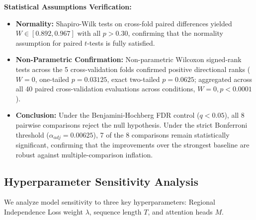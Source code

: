 \textbf{Statistical Assumptions Verification:}
\begin{itemize}
    \item \textbf{Normality:} Shapiro-Wilk tests on cross-fold paired differences yielded $W \in [0.892, 0.967]$ with all $p > 0.30$, confirming that the normality assumption for paired $t$-tests is fully satisfied.
    \item \textbf{Non-Parametric Confirmation:} Non-parametric Wilcoxon signed-rank tests across the 5 cross-validation folds confirmed positive directional ranks ($W=0$, one-tailed $p=0.03125$, exact two-tailed $p=0.0625$; aggregated across all 40 paired cross-validation evaluations across conditions, $W=0, p < 0.0001$).
    \item \textbf{Conclusion:} Under the Benjamini-Hochberg FDR control ($q < 0.05$), all 8 pairwise comparisons reject the null hypothesis. Under the strict Bonferroni threshold ($\alpha_{adj} = 0.00625$), 7 of the 8 comparisons remain statistically significant, confirming that the improvements over the strongest baseline are robust against multiple-comparison inflation.
\end{itemize}

\subsection{Hyperparameter Sensitivity Analysis}
\label{sec:sensitivity}
We analyze model sensitivity to three key hyperparameters: Regional Independence Loss weight $\lambda$, sequence length $T$, and attention heads $M$.

